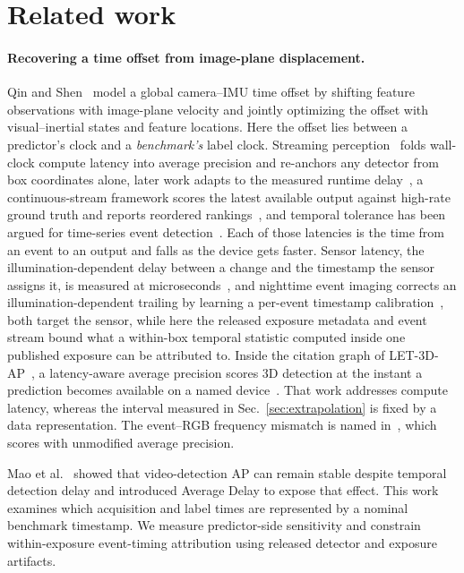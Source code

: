 \documentclass[10pt,twocolumn,letterpaper]{article}
\begin{document}
\section{Related work}
\label{sec:related}

\paragraph{Recovering a time offset from image-plane displacement.} Qin and
Shen~\cite{qin2018temporal} model a global camera--IMU time offset by shifting
feature observations with image-plane velocity and jointly optimizing the offset
with visual--inertial states and feature locations. Here the offset lies between
a predictor's clock and
a \emph{benchmark's} label clock. Streaming perception~\cite{li2020streaming}
folds wall-clock compute latency into average precision and re-anchors any
detector from box coordinates alone, later work adapts to the measured runtime
delay~\cite{yang2022streamyolo}, a continuous-stream framework scores the latest
available output against high-rate ground truth and reports reordered
rankings~\cite{chu2026stare}, and temporal tolerance has been argued for
time-series event detection~\cite{softed2024}. Each of those latencies is the
time from an event to an output and falls as the device gets faster. Sensor
latency, the illumination-dependent delay between a change and the timestamp the
sensor assigns it, is measured at
microseconds~\cite{yang2024latency}, and nighttime event imaging corrects an
illumination-dependent trailing by learning a per-event timestamp
calibration~\cite{liu2024nighttime}, both target the sensor, while here the
released exposure metadata and event stream bound what a within-box temporal
statistic computed inside one published exposure can be attributed to. Inside
the citation graph of LET-3D-AP~\cite{hung2022let}, a latency-aware average
precision scores 3D detection at the instant a prediction becomes available on
a named device~\cite{rethink3d2025}. That work addresses compute latency,
whereas the interval measured in Sec.~\ref{sec:extrapolation} is fixed by a data representation. The
event--RGB frequency mismatch is named in~\cite{faod2024}, which scores with
unmodified average precision.

Mao et al.~\cite{mao2019delay} showed that video-detection AP can remain stable
despite temporal detection delay and introduced Average Delay to expose that
effect. This work examines which acquisition and label times are represented by
a nominal benchmark timestamp. We measure predictor-side sensitivity and constrain
within-exposure event-timing attribution using released detector and exposure
artifacts.
\end{document}
